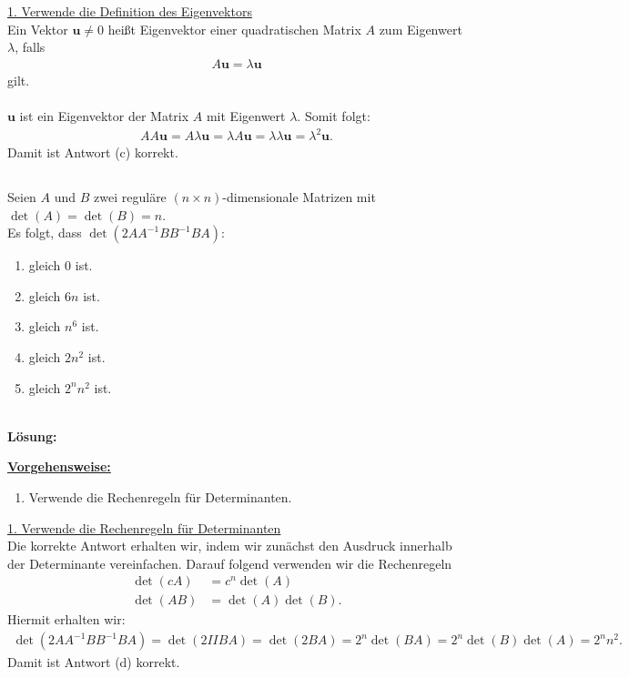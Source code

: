 \underline{1. Verwende die Definition des Eigenvektors}\\
Ein Vektor $\mathbf{u} \neq 0$ heißt Eigenvektor einer quadratischen Matrix $A$ zum Eigenwert $\lambda$, falls
\begin{align*}
	A \mathbf{u} = \lambda \mathbf{u}
\end{align*}
gilt.\\
\\
$\mathbf{u}$ ist ein Eigenvektor der Matrix $A$ mit Eigenwert $\lambda $.
Somit folgt:
\begin{align*}
	A A \mathbf{u} 
	=
	A \lambda \mathbf{u} 
	= 
	\lambda A \mathbf{u} 
	= 
	\lambda \lambda \mathbf{u}
	= 
	\lambda^2 \mathbf{u}.
\end{align*}
Damit ist Antwort (c) korrekt.



\newpage
\subsection*{}
Seien $A$ und $B$ zwei reguläre $(n \times n)$-dimensionale Matrizen mit $\det(A) = \det(B) = n$.\\
Es folgt, dass $\det(2AA^{-1} B B^{-1} B A)$:
\renewcommand{\labelenumi}{(\alph{enumi})}
\begin{enumerate}
	\item 
	gleich $0$ ist.
	\item
	gleich $6n$ ist.
	\item
	gleich $n^6$ ist.
	\item
	gleich $2 n^2$ ist.
	\item
	gleich $2^n n^2$ ist.
\end{enumerate}
\ \\
\textbf{Lösung:}
\begin{mdframed}
\underline{\textbf{Vorgehensweise:}}
\renewcommand{\labelenumi}{\theenumi.}
\begin{enumerate}
\item Verwende die Rechenregeln für Determinanten.
\end{enumerate}
\end{mdframed}

\underline{1. Verwende die Rechenregeln für Determinanten}\\
Die korrekte Antwort erhalten wir, indem wir zunächst den Ausdruck innerhalb der Determinante vereinfachen. 
Darauf folgend verwenden wir die Rechenregeln
\begin{align*}
	\det(c A)&= c^n \det(A)\\
	\det(AB) &= \det(A) \det(B).
\end{align*}
Hiermit erhalten wir:
\begin{align*}
	\det(2AA^{-1} B B^{-1} B A)
	=
	\det(2I I B A)
	=
	\det(2B A)
	=
	2^n \det(BA) 
	=
	2^n \det(B) \det(A)
	=
	2^n n^2.
\end{align*}
Damit ist Antwort (d) korrekt.

